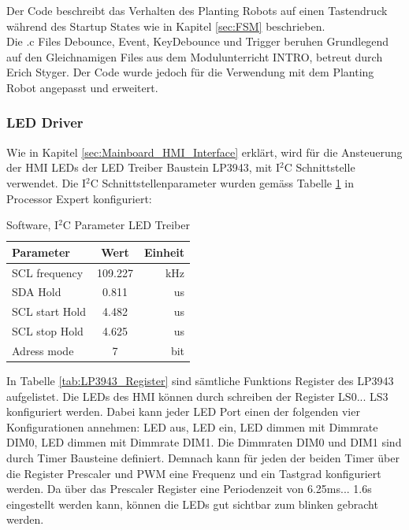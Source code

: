 Der Code beschreibt das Verhalten des Planting Robots auf einen Tastendruck während des Startup States wie in Kapitel \ref{sec:FSM} beschrieben. \\
\newline
Die .c Files Debounce, Event, KeyDebounce und Trigger beruhen Grundlegend auf den Gleichnamigen Files aus dem Modulunterricht INTRO, betreut durch Erich Styger. Der Code wurde jedoch für die Verwendung mit dem Planting Robot angepasst und erweitert.

\subsubsection{LED Driver}
Wie in Kapitel \ref{sec:Mainboard_HMI_Interface} erklärt, wird für die Ansteuerung der HMI LEDs der LED Treiber Baustein LP3943, mit I$^{2}$C Schnittstelle verwendet. Die I$^{2}$C Schnittstellenparameter wurden gemäss Tabelle \ref{tab:I2C_Parameter} in Processor Expert konfiguriert:

\begin{table}[H]
	\centering
	\caption{Software, I$^{2}$C Parameter LED Treiber}
	\begin{tabular}{|l|c|r|}
		\hline
		\textbf{Parameter} & \textbf{Wert} & \textbf{Einheit} \\
		\hline
		SCL frequency & 109.227 & kHz \\
		\hline
		SDA Hold & 0.811 & us \\
		\hline
		SCL start Hold & 4.482 & us \\
		\hline
		SCL stop Hold & 4.625 & us \\
		\hline
		Adress mode & 7     & bit \\
		\hline
	\end{tabular}%
	\label{tab:I2C_Parameter}%
\end{table}%

In Tabelle \ref{tab:LP3943_Register} sind sämtliche Funktions Register des LP3943 aufgelistet. Die LEDs des HMI können durch schreiben der Register LS0... LS3 konfiguriert werden. Dabei kann jeder LED Port einen der folgenden vier Konfigurationen annehmen: LED aus, LED ein, LED dimmen mit Dimmrate DIM0, LED dimmen mit Dimmrate DIM1. Die Dimmraten DIM0 und DIM1 sind durch Timer Bausteine definiert. Demnach kann für jeden der beiden Timer über die Register Prescaler und PWM eine Frequenz und ein Tastgrad konfiguriert werden. Da über das Prescaler Register eine Periodenzeit von 6.25ms... 1.6s eingestellt werden kann, können die LEDs gut sichtbar zum blinken gebracht werden.


